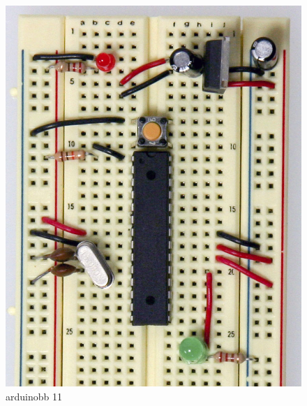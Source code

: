 \begin{figure}[!htb]
 \centering
 \includegraphics[scale=0.3]{img/arduino_breadboard/arduinobb_11.jpg}
 \caption{arduinobb 11}
 \label{arduinobb 11}
\end{figure}


